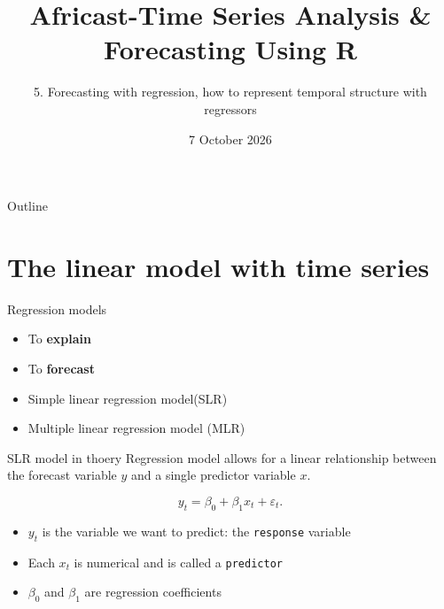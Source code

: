 \documentclass[
  14pt,
  ignorenonframetext,
  aspectratio=169,
]{beamer}
\title{\texorpdfstring{Africast-Time Series Analysis \& Forecasting
Using R}{Africast-Time Series Analysis \& Forecasting Using R}}
\subtitle{\texorpdfstring{5. Forecasting with regression, how to
represent temporal structure with
regressors}{5. Forecasting with regression, how to represent temporal structure with regressors}}
\author{}
\date{7 October 2026}
\providecommand{\tightlist}{%
  \setlength{\itemsep}{0pt}\setlength{\parskip}{0pt}}
\begin{document}
\frame{\titlepage}


\begin{frame}{Outline}
\protect{}\label{outline}
\vspace*{0.7cm}\tableofcontents
\end{frame}

\section{The linear model with time
series}\label{the-linear-model-with-time-series}

\begin{frame}{Regression models}
\protect{}\label{regression-models}
\begin{itemize}
\tightlist
\item
  To \textbf{explain}
\item
  To \textbf{forecast}
\end{itemize}

\vspace*{0.3cm}

\begin{itemize}
\tightlist
\item
  Simple linear regression model(SLR)
\item
  Multiple linear regression model (MLR)
\end{itemize}
\end{frame}

\begin{frame}[fragile]{SLR model in thoery}
\protect{}\label{slr-model-in-thoery}
Regression model allows for a linear relationship between the forecast
variable \(y\) and a single predictor variable \(x\).

\fontsize{13}{15}\sf

\begin{block}{}\vspace*{-0.3cm}
$$
  y_t = \beta_0 + \beta_1 x_{t} + \varepsilon_t.
$$
\end{block}

\begin{itemize}
\tightlist
\item
  \(y_t\) is the variable we want to predict: the \texttt{response}
  variable
\item
  Each \(x_{t}\) is numerical and is called a \texttt{predictor}
\item
  \(\beta_0\) and \(\beta_1\) are regression coefficients
\end{itemize}
\end{frame}
\end{document}
